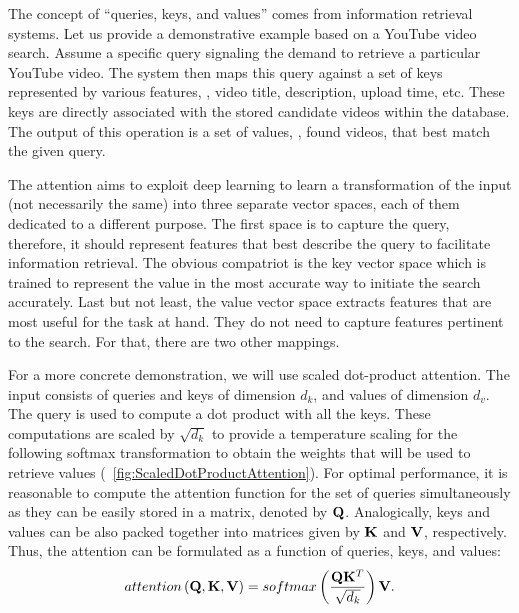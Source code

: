 The concept of ``queries, keys, and values'' comes from information retrieval systems. Let us provide a demonstrative example based on a YouTube video search. Assume a specific query signaling the demand to retrieve a particular YouTube video. The system then maps this query against a set of keys represented by various features, \egtext{}, video title, description, upload time, etc. These keys are directly associated with the stored candidate videos within the database. The output of this operation is a set of values, \ietext{}, found videos, that best match the given query.

The attention aims to exploit deep learning to learn a transformation of the input (not necessarily the same) into three separate vector spaces, each of them dedicated to a different purpose. The first space is to capture the query, therefore, it should represent features that best describe the query to facilitate information retrieval. The obvious compatriot is the key vector space which is trained to represent the value in the most accurate way to initiate the search accurately. Last but not least, the value vector space extracts features that are most useful for the task at hand. They do not need to capture features pertinent to the search. For that, there are two other mappings.

For a more concrete demonstration, we will use scaled dot-product attention. The input consists of queries and keys of dimension $d_k$, and values of dimension $d_v$. The query is used to compute a dot product with all the keys. These computations are scaled by $\sqrt{d_k}$ to provide a temperature scaling for the following softmax transformation to obtain the weights that will be used to retrieve values (\figtext{}~\ref{fig:ScaledDotProductAttention}). For optimal performance, it is reasonable to compute the attention function for the set of queries simultaneously as they can be easily stored in a matrix, denoted by $\mathbf{Q}$. Analogically, keys and values can be also packed together into matrices given by $\mathbf{K}$ and $\mathbf{V}$, respectively. Thus, the attention can be formulated as a function of queries, keys, and values:
\begin{equation}
  \label{eq:ScaledDotProductAttention}
  {attention} \left( \mathbf{Q}, \mathbf{K}, \mathbf{V} \right) =
  {softmax} \left( \frac{\mathbf{Q} \mathbf{K}^T}{\sqrt{d_k}} \right) \mathbf{V}.
\end{equation}

